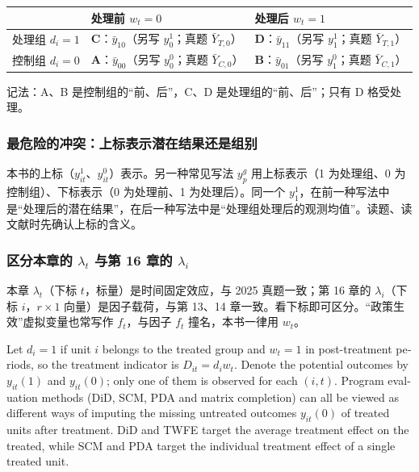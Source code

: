 \begin{center}
\small
\begin{tabular}{lll}
\toprule
 & 处理前 $w_t=0$ & 处理后 $w_t=1$\\
\midrule
处理组 $d_i=1$ & \textbf{C}：$\bar y_{10}$（另写 $y^1_0$；真题 $\bar Y_{T,0}$） & \textbf{D}：$\bar y_{11}$（另写 $y^1_1$；真题 $\bar Y_{T,1}$）\\
控制组 $d_i=0$ & \textbf{A}：$\bar y_{00}$（另写 $y^0_0$；真题 $\bar Y_{C,0}$） & \textbf{B}：$\bar y_{01}$（另写 $y^0_1$；真题 $\bar Y_{C,1}$）\\
\bottomrule
\end{tabular}
\end{center}
记法：A、B 是控制组的“前、后”，C、D 是处理组的“前、后”；只有 D 格受处理。

\subsubsection{最危险的冲突：上标表示潜在结果还是组别}

本书的上标（$y^1_{it}$、$y^0_{it}$）表示。另一种常见写法 $y^g_p$ 用上标表示（1 为处理组、0 为控制组）、下标表示（0 为处理前、1 为处理后）。同一个 $y^1_1$，在前一种写法中是“处理后的潜在结果”，在后一种写法中是“处理组处理后的观测均值”。读题、读文献时先确认上标的含义。

\subsubsection{区分本章的 \texorpdfstring{$\lambda_t$}{lambda\_t} 与第 16 章的 \texorpdfstring{$\lambda_i$}{lambda\_i}}

本章 $\lambda_t$（下标 $t$，标量）是时间固定效应，与 2025 真题一致；第 16 章的 $\lambda_i$（下标 $i$，$r\times1$ 向量）是因子载荷，与第 13、14 章一致。看下标即可区分。“政策生效”虚拟变量也常写作 $f_t$，与因子 $f_t$ 撞名，本书一律用 $w_t$。

\begin{english}
Let $d_i=1$ if unit $i$ belongs to the treated group and $w_t=1$ in post-treatment periods, so the treatment indicator is $D_{it}=d_iw_t$. Denote the potential outcomes by $y_{it}(1)$ and $y_{it}(0)$; only one of them is observed for each $(i,t)$. Program evaluation methods (DiD, SCM, PDA and matrix completion) can all be viewed as different ways of imputing the missing untreated outcomes $y_{it}(0)$ of treated units after treatment. DiD and TWFE target the average treatment effect on the treated, while SCM and PDA target the individual treatment effect of a single treated unit.
\end{english}

